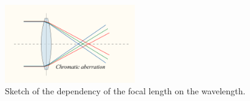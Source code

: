 \begin{figure}
	\centering
	\includegraphics[width = 0.5\textwidth]{pictures/bildabberationwiki.png}
	\caption[Chromatic aberration, picture taken from http://en.wikipedia.org/wiki /File:Chromatic\_abberation\_lens\_diagram.svg, at 23rd of May 2013]{Sketch of the dependency of the focal length on the wavelength.}
	\label{wikibild1}
	\end{figure}


